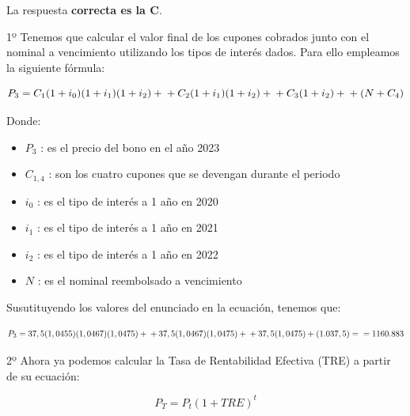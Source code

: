 \documentclass[
  letterpaper,
  DIV=11,
  numbers=noendperiod]{scrreprt}
\begin{document}
\begin{tcolorbox}[enhanced jigsaw, left=2mm, opacityback=0, colback=white, breakable, arc=.35mm, bottomrule=.15mm, rightrule=.15mm, toprule=.15mm, leftrule=.75mm, colframe=quarto-callout-tip-color-frame]
\begin{minipage}[t]{5.5mm}
\textcolor{quarto-callout-tip-color}{\faLightbulb}
\end{minipage}%
\begin{minipage}[t]{\textwidth - 5.5mm}

La respuesta \textbf{correcta es la C}.

1º Tenemos que calcular el valor final de los cupones cobrados junto con
el nominal a vencimiento utilizando los tipos de interés dados. Para
ello empleamos la siguiente fórmula:

\[{ P }_{ 3 } = { C }_{ 1 }(1+{ i }_{ 0 })(1+{ i }_{ 1 })(1+{ i }_{ 2 })+\\+{ C }_{ 2 }(1+{ i }_{ 1 })(1+{ i }_{ 2 })+\\+{ C }_{ 3 }(1+{ i }_{ 2 })+\\+(N+{ C }_{ 4 })\]

Donde:

\begin{itemize}
\item
  \({ P }_{ 3 }\) : es el precio del bono en el año 2023
\item
  \({ C }_{ 1,4 }\) : son los cuatro cupones que se devengan durante el
  periodo
\item
  \({ i }_{ 0 }\) : es el tipo de interés a 1 año en 2020
\item
  \({ i }_{ 1 }\) : es el tipo de interés a 1 año en 2021
\item
  \({ i }_{ 2 }\) : es el tipo de interés a 1 año en 2022
\item
  \(N\) : es el nominal reembolsado a vencimiento
\end{itemize}

Susutituyendo los valores del enunciado en la ecuación, tenemos que:

\[{ P }_{ 3 }=37,5(1,0455)(1,0467)(1,0475)+\\+37,5(1,0467)(1,0475)+\\+37,5(1,0475)+(1.037,5)=\\=1160.883\]

2º Ahora ya podemos calcular la Tasa de Rentabilidad Efectiva (TRE) a
partir de su ecuación:

\[{ P }_{ T }={ P }_{ t }{ (1+TRE) }^{ t }\]


\end{minipage}
\end{tcolorbox}
\end{document}
